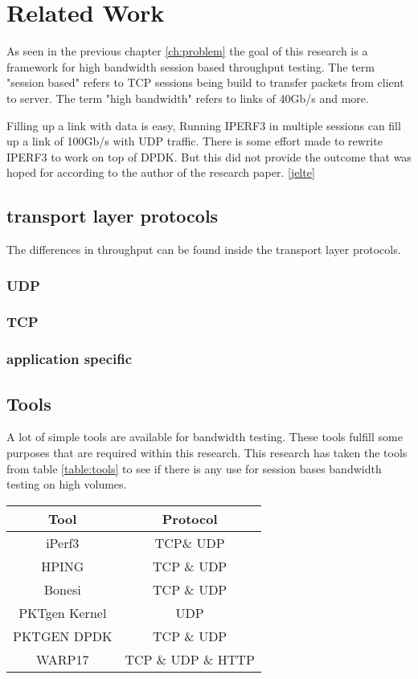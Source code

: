 \chapter{Related Work}\label{ch:related}
As seen in the previous chapter \ref{ch:problem} the goal of this research is a framework for high bandwidth session based throughput testing.
The term "session based" refers to TCP sessions being build to transfer packets from client to server. 
The term "high bandwidth" refers to links of 40Gb/s and more.

Filling up a link with data is easy, Running IPERF3 in multiple sessions can fill up a link of 100Gb/s with UDP traffic. 
There is some effort made to rewrite IPERF3 to work on top of DPDK. But this did not provide the outcome that was hoped for according to the author of the research paper. \ref{jelte}

\section{transport layer protocols}
The differences in throughput can be found inside the transport layer protocols.
\subsection{UDP}


\subsection{TCP}


\subsection{application specific}


\section{Tools}\label{sec:tools}
A lot of simple tools are available for bandwidth testing. These tools fulfill some purposes that are required within this research.
This research has taken the tools from table \ref{table:tools} to see if there is any use for session bases bandwidth testing on high volumes. 

\begin{table*}[ht]
\centering
\begin{tabular}{|c|c|} \hline
\textbf{Tool} & \textbf{Protocol} \\ \hline
iPerf3 & TCP\& UDP \\ \hline
HPING  & TCP \& UDP\\ \hline
Bonesi & TCP \& UDP\\ \hline
PKTgen Kernel & UDP \\ \hline
PKTGEN DPDK & TCP \& UDP \\ \hline
WARP17 & TCP \& UDP \& HTTP \\ \hline
\end{tabular}
\caption{available tools}
\label{table:tools}
\end{table*} 

